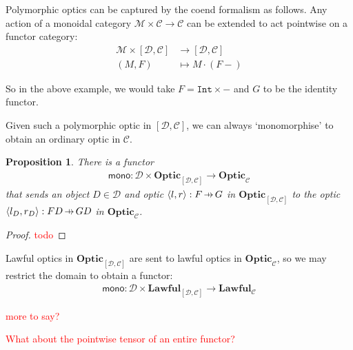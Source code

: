 \documentclass[11pt,a4paper]{article}
\theoremstyle{plain}
\newtheorem{proposition}[theorem]{Proposition}
\theoremstyle{definition}
\newcommand{\C}{\mathscr{C}}
\newcommand{\D}{\mathscr{D}}
\newcommand{\M}{\mathscr{M}}
\newcommand{\Optic}{\mathbf{Optic}}
\newcommand{\Lawful}{\mathbf{Lawful}}
\newcommand{\hto}{\ensuremath{\,\mathaccent\shortmid\rightarrow\,}}
\newcommand{\todo}[1]{\textcolor{red}{\small #1}}
\begin{document}
Polymorphic optics can be captured by the coend formalism as follows. Any action of a monoidal category $\M \times \C \to \C$ can be extended to act pointwise on a functor category:
\begin{align*}
\M \times [\D, \C] &\to [\D, \C] \\
(M, F) &\mapsto  M \cdot (F-)
\end{align*}

So in the above example, we would take $F = \mathtt{Int} \times -$ and $G$ to be the identity functor.

Given such a polymorphic optic in $[\D, \C]$, we can always `monomorphise' to obtain an ordinary optic in $\C$.
\begin{proposition}
There is a functor 
\begin{align*}
\mathsf{mono} : \D \times \Optic_{[\D, \C]} \to \Optic_\C
\end{align*}
that sends an object $D \in \D$ and optic $\langle l, r \rangle : F \hto G$ in $\Optic_{[\D, \C]}$ to the optic $\langle l_D, r_D \rangle : FD \hto GD$ in $\Optic_\C$.
\end{proposition}
\begin{proof}
\todo{todo}
\end{proof}

Lawful optics in $\Optic_{[\D, \C]}$ are sent to lawful optics in $\Optic_\C$,  so we may restrict the domain to obtain a functor:
\begin{align*}
\mathsf{mono} : \D \times \Lawful_{[\D, \C]} \to \Lawful_\C
\end{align*}

\todo{more to say?}

\todo{What about the pointwise tensor of an entire functor?}
\end{document}
